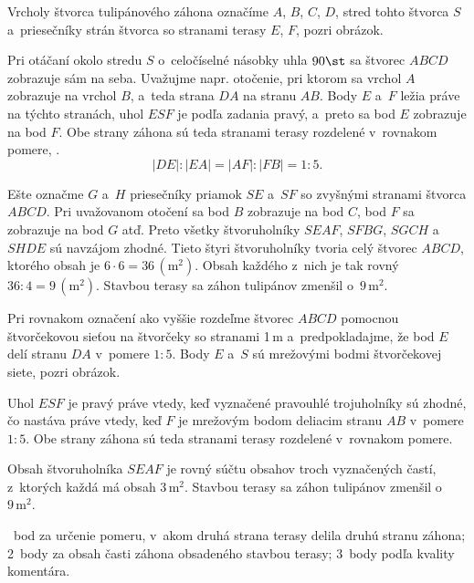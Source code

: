 {%
Vrcholy štvorca tulipánového záhona označíme $A$, $B$, $C$, $D$, stred tohto štvorca $S$ a~priesečníky strán štvorca so stranami terasy $E$, $F$, pozri obrázok.
%

Pri otáčaní okolo stredu $S$ o~celočíselné násobky uhla $90\st$ sa štvorec $ABCD$ zobrazuje sám na seba.
Uvažujme napr. otočenie, pri ktorom sa vrchol $A$ zobrazuje na vrchol $B$, a~teda strana $DA$ na stranu $AB$.
Body $E$ a~$F$ ležia práve na týchto stranách, uhol $ESF$ je podľa zadania pravý, a~preto sa bod $E$ zobrazuje na bod $F$.
Obe strany záhona sú teda stranami terasy rozdelené v~rovnakom pomere, \tj.
$$
|DE|:|EA|=|AF|:|FB|=1:5.
$$

Ešte označme $G$ a~$H$ priesečníky priamok $SE$ a~$SF$ so zvyšnými stranami štvorca $ABCD$.
Pri uvažovanom otočení sa bod $B$ zobrazuje na bod $C$, bod $F$ sa zobrazuje na bod $G$ atď.
Preto všetky štvoruholníky $SEAF$, $SFBG$, $SGCH$ a~$SHDE$ sú navzájom zhodné.
Tieto štyri štvoruholníky tvoria celý štvorec $ABCD$, ktorého obsah je $6\cdot 6=36\,(\text{m}^2)$.
Obsah každého z~nich je tak rovný $36:4=9\,(\text{m}^2)$.
Stavbou terasy sa záhon tulipánov zmenšil o~$9\,\text{m}^2$.

\ineriesenie
Pri rovnakom označení ako vyššie rozdeľme štvorec $ABCD$ pomocnou štvorčekovou sieťou na štvorčeky so stranami 1\,m
a~predpokladajme, že bod $E$ delí stranu $DA$ v~pomere $1:5$.
Body $E$ a~$S$ sú mrežovými bodmi štvorčekovej siete, pozri obrázok.
%


Uhol $ESF$ je pravý práve vtedy, keď vyznačené pravouhlé trojuholníky sú zhodné,
čo nastáva práve vtedy, keď $F$ je mrežovým bodom deliacim stranu $AB$ v~pomere $1:5$.
Obe strany záhona sú teda stranami terasy rozdelené v~rovnakom pomere.

Obsah štvoruholníka $SEAF$ je rovný súčtu obsahov troch vyznačených častí, z~ktorých každá má obsah $3\,\text{m}^2$.
Stavbou terasy sa záhon tulipánov zmenšil o~$9\,\text{m}^2$.

~bod za určenie pomeru, v~akom druhá strana terasy delila druhú stranu záhona;
2~body za obsah časti záhona obsadeného stavbou terasy;
3~body podľa kvality komentára.
\endhodnotenie
}

